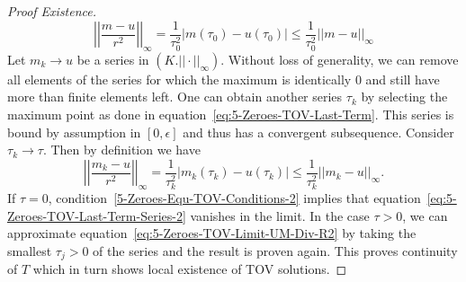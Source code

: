 \begin{proof}[Proof  Existence]
	\begin{equation}
		\left|\left|\frac{m-u}{r^2}\right|\right|_{\infty} = \frac{1}{\tau_0^2}|m(\tau_0)-u(\tau_0)|\leq\frac{1}{\tau_0^2}||m-u||_{\infty}
		\label{eq:5-Zeroes-TOV-Last-Term}
	\end{equation}
	Let $m_k\rightarrow u$ be a series in $(K.||\cdot||_\infty)$.
	Without loss of generality, we can remove all elements of the series for which the maximum is identically $0$ and still have more than finite elements left.
	One can obtain another series $\tau_k$ by selecting the maximum point as done in equation~\eqref{eq:5-Zeroes-TOV-Last-Term}.
	This series is bound by assumption in $[0,\epsilon]$ and thus has a convergent subsequence.
	Consider $\tau_k\rightarrow\tau$.
	Then by definition we have
	\begin{equation}
		\left|\left|\frac{m_k-u}{r^2}\right|\right|_{\infty} = \frac{1}{\tau_k^2}\left|m_k(\tau_k)-u(\tau_k)\right| \leq \frac{1}{\tau_k^2} \left|\left|m_k-u\right|\right|_{\infty}.
		\label{eq:5-Zeroes-TOV-Last-Term-Series-2}
	\end{equation}
	If $\tau=0$, condition~\eqref{5-Zeroes-Equ-TOV-Conditions-2} implies that equation~\eqref{eq:5-Zeroes-TOV-Last-Term-Series-2} vanishes in the limit.
	In the case $\tau>0$, we can approximate equation~\eqref{eq:5-Zeroes-TOV-Limit-UM-Div-R2} by taking the smallest $\tau_{j}>0$ of the series and the result is proven again.
	This proves continuity of $T$ which in turn shows local existence of \ac{TOV} solutions.
\end{proof}%
